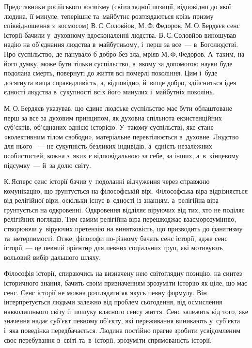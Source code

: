 \documentclass[a5paper,oneside,DIV=12,12pt,headings=small]{scrartcl}
\begin{document}
		Представники російського космізму (світоглядної позиції, відповідно до якої людина, її минуле, теперішнє та~майбутнє розглядаються крізь призму співвідношення з~космосом) В.\,С.\,Соловйов, М.\,Ф.\,Федоров, М.\,О.\,Бер\-дя\-єв сенс історії бачили у~духовному вдосконаленні людства. В.\,С.\,Соловйов виношував надію на об'єднання людства в~майбутньому, і~перш за все~— в~Боголюдстві. Про суспільство, де панувало б добро без зла, мріяв М.\,Ф.\,Федоров. А~таким, на його думку, може бути тільки суспільство, в~якому за допомогою науки буде подолана смерть, повернуті до життя всі померлі покоління. Цим і~буде досягнута вища справедливість, а, відповідно, й~вище добро, здійсниться ідея єдності людства в~сукупності всіх його минулих і~майбутніх поколінь.
		
		М.\,О.\,Бердяєв указував, що єдине людське суспільство має бути облаштоване перш за все за духовим принципом, як духовна спільнота екзистенційних суб'\-єктів, об'єднаних однією історією. У~такому суспільстві, яке стане «колективним тілом свободи», матеріальне перевтілюється в~духовне. Людство для нього ~— не сукупність безликих індивідів, а~єдність незалежних особистостей, кожна з~яких є відповідальною за себе, за інших, а~в~кінцевому підсумку~— й~за долю світу.
		
		К.\,Ясперс сенс історії бачив у~подоланні відчуження через справжню комунікацію, що ґрунтується на філософській вірі. Філософська віра відрізняється від релігійної віри, оскільки існує в~єдності із знанням, а~релігійна віра ґрунтується на одкровенні. Одкровення відділяє віруючих від тих, хто не поділяє релігійних поглядів. Тим самим релігійна віра перешкоджає взаєморозумінню, створюючи у~віруючих претензію на винятковість, що призводить до фанатизму та~нетерпимості. Отже, філософи по-різному бачать сенс історії, адже сенс історії~— це певний орієнтир для певних соціальних груп, які мотивують вольовий вибір дальшого шляху.
		
		Філософія історії, спираючись на визначену нею світоглядну позицію, на синтез історичного знання, бачить своїм призначенням зрозуміти історію як ціле, що має сенс. Сенс історії не можна розглядати як якусь певну формулу. Він інтерпретується людьми залежно від проблем сьогодення, від осмислення навколишнього світу й~пошуку власного сенсу життя. Сенс залежить від того, яке значення надає суб'\-єкт певному об'\-єкту, які переживання виникають у~суб'\-єкта і~яка поведінка передбачається. Людина постійно прагне зробити усвідомленим своє перебування в~світі та~в~історії, зрозуміти спрямованість історії. 
		
\end{document}
